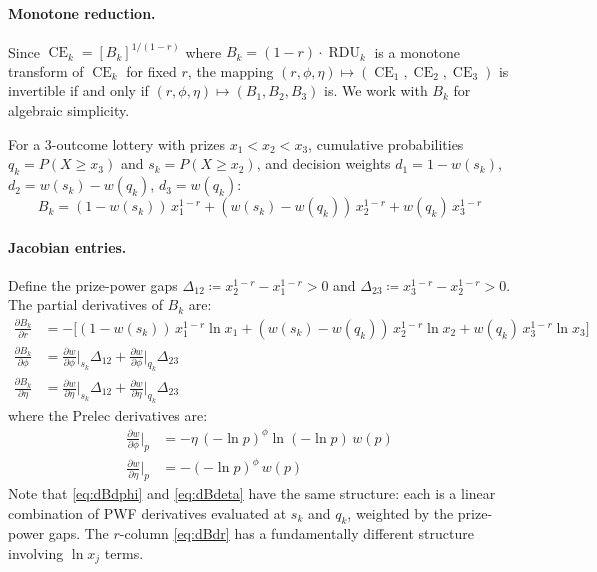 \documentclass[11pt,a4paper]{article}
\theoremstyle{definition}
\DeclareMathOperator{\CE}{CE}
\DeclareMathOperator{\RDU}{RDU}
\begin{document}
\paragraph{Monotone reduction.} Since
$\CE_k = [B_k]^{1/(1-r)}$ where $B_k = (1-r) \cdot \RDU_k$ is a monotone
transform of $\CE_k$ for fixed $r$, the mapping
$(r, \phi, \eta) \mapsto (\CE_1, \CE_2, \CE_3)$ is invertible if and only if
$(r, \phi, \eta) \mapsto (B_1, B_2, B_3)$ is. We work with $B_k$ for
algebraic simplicity.

For a 3-outcome lottery with prizes $x_1 < x_2 < x_3$, cumulative
probabilities $q_k = P(X \geq x_3)$ and $s_k = P(X \geq x_2)$, and decision
weights $d_1 = 1 - w(s_k)$, $d_2 = w(s_k) - w(q_k)$, $d_3 = w(q_k)$:
\begin{equation}
    \label{eq:B_k}
    B_k = (1 - w(s_k)) \, x_1^{1-r} + (w(s_k) - w(q_k)) \, x_2^{1-r}
    + w(q_k) \, x_3^{1-r}
\end{equation}

\paragraph{Jacobian entries.} Define the prize-power gaps
$\Delta_{12} \coloneqq x_2^{1-r} - x_1^{1-r} > 0$ and
$\Delta_{23} \coloneqq x_3^{1-r} - x_2^{1-r} > 0$. The partial derivatives of
$B_k$ are:
\begin{align}
    \frac{\partial B_k}{\partial r} &= -\Big[
        (1 - w(s_k)) \, x_1^{1-r} \ln x_1
        + (w(s_k) - w(q_k)) \, x_2^{1-r} \ln x_2
        + w(q_k) \, x_3^{1-r} \ln x_3 \Big]
    \label{eq:dBdr} \\[6pt]
    \frac{\partial B_k}{\partial \phi} &=
        \frac{\partial w}{\partial \phi}\bigg|_{s_k} \Delta_{12}
        + \frac{\partial w}{\partial \phi}\bigg|_{q_k} \Delta_{23}
    \label{eq:dBdphi} \\[6pt]
    \frac{\partial B_k}{\partial \eta} &=
        \frac{\partial w}{\partial \eta}\bigg|_{s_k} \Delta_{12}
        + \frac{\partial w}{\partial \eta}\bigg|_{q_k} \Delta_{23}
    \label{eq:dBdeta}
\end{align}
where the Prelec derivatives are:
\begin{align}
    \frac{\partial w}{\partial \phi}\bigg|_p &= -\eta \, (-\ln p)^\phi
        \ln(-\ln p) \, w(p)
    \label{eq:dwdphi} \\
    \frac{\partial w}{\partial \eta}\bigg|_p &= -(-\ln p)^\phi \, w(p)
    \label{eq:dwdeta}
\end{align}
Note that \eqref{eq:dBdphi} and \eqref{eq:dBdeta} have the same structure:
each is a linear combination of PWF derivatives evaluated at $s_k$ and $q_k$,
weighted by the prize-power gaps. The $r$-column \eqref{eq:dBdr} has a
fundamentally different structure involving $\ln x_j$ terms.
\end{document}

